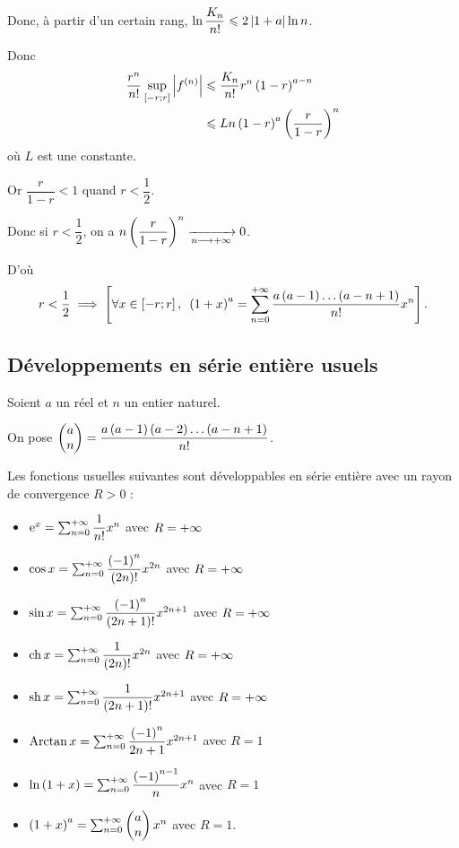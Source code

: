 \begin{corr}
Donc, à partir d'un certain rang, \(\ln\dfrac{K_n}{n!}\leq2\abs{1+a}\ln n\).

Donc \[\begin{aligned}
\dfrac{r^n}{n!}\sup_{\intervii{-r}{r}}\abs{f\deriv{n}}&\leq\dfrac{K_n}{n!}r^n\paren{1-r}^{a-n} \\
&\leq Ln\paren{1-r}^a\paren{\dfrac{r}{1-r}}^n
\end{aligned}\] où \(L\) est une constante.

Or \(\dfrac{r}{1-r}<1\) quand \(r<\dfrac{1}{2}\).

Donc si \(r<\dfrac{1}{2}\), on a \(n\paren{\dfrac{r}{1-r}}^n\tendqd{n\to\pinf}0\).

D'où \[r<\dfrac{1}{2}\imp\croch{\quantifs{\forall x\in\intervii{-r}{r}}\paren{1+x}^a=\sum_{n=0}^{\pinf}\dfrac{a\paren{a-1}\dots\paren{a-n+1}}{n!}x^n}.\]
\end{corr}

\subsection{Développements en série entière usuels}

Soient \(a\) un réel et \(n\) un entier naturel.

On pose \(\binom{n}{a}=\dfrac{a\paren{a-1}\paren{a-2}\dots\paren{a-n+1}}{n!}\).

Les fonctions usuelles suivantes sont développables en série entière avec un rayon de convergence \(R>0\) :

\begin{itemize}
    \item \(\e{x}=\sum_{n=0}^{\pinf}\dfrac{1}{n!}x^n\) avec \(R=\pinf\) \\
    \item \(\cos x=\sum_{n=0}^{\pinf}\dfrac{\paren{-1}^n}{\paren{2n}!}x^{2n}\) avec \(R=\pinf\) \\
    \item \(\sin x=\sum_{n=0}^{\pinf}\dfrac{\paren{-1}^n}{\paren{2n+1}!}x^{2n+1}\) avec \(R=\pinf\) \\
    \item \(\ch x=\sum_{n=0}^{\pinf}\dfrac{1}{\paren{2n}!}x^{2n}\) avec \(R=\pinf\) \\
    \item \(\sh x=\sum_{n=0}^{\pinf}\dfrac{1}{\paren{2n+1}!}x^{2n+1}\) avec \(R=\pinf\) \\
    \item \(\Arctan x=\sum_{n=0}^{\pinf}\dfrac{\paren{-1}^n}{2n+1}x^{2n+1}\) avec \(R=1\) \\
    \item \(\ln\paren{1+x}=\sum_{n=0}^{\pinf}\dfrac{\paren{-1}^{n-1}}{n}x^n\) avec \(R=1\) \\
    \item \(\paren{1+x}^a=\sum_{n=0}^{\pinf}\binom{n}{a}x^n\) avec \(R=1\).
\end{itemize}

